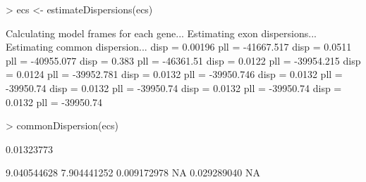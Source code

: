 \documentclass{article}
\begin{document}
\begin{Schunk}
\begin{Sinput}
> ecs <- estimateDispersions(ecs)
\end{Sinput}
\begin{Soutput}
Calculating model frames for each gene...
Estimating exon dispersions...
Estimating common dispersion...
disp =  0.00196	pll = -41667.517
disp =   0.0511	pll = -40955.077
disp =    0.383	pll = -46361.51
disp =   0.0122	pll = -39954.215
disp =   0.0124	pll = -39952.781
disp =   0.0132	pll = -39950.746
disp =   0.0132	pll = -39950.74
disp =   0.0132	pll = -39950.74
disp =   0.0132	pll = -39950.74
disp =   0.0132	pll = -39950.74
\end{Soutput}
\begin{Sinput}
> commonDispersion(ecs)
\end{Sinput}
\begin{Soutput}
[1] 0.01323773
\end{Soutput}
\begin{Soutput}
[1] 9.040544628 7.904441252 0.009172978          NA 0.029289040          NA
\end{Soutput}
\end{Schunk}
\end{document}
